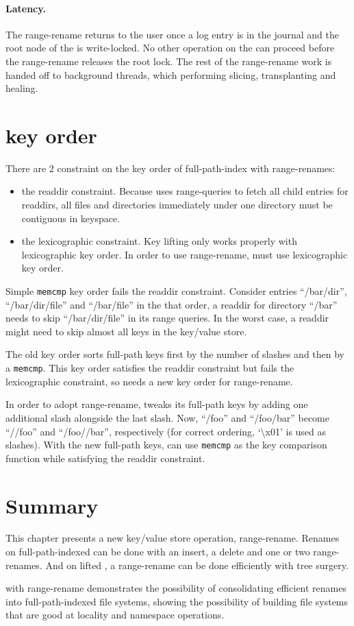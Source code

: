\paragraph{Latency.}
The range-rename returns to the user once a log entry is in the journal and the
root node of the \bet is write-locked.
No other operation on the \bet can proceed before the range-rename releases the
root lock.
The rest of the range-rename work is handed off to background threads, which
performing slicing, transplanting and healing.

\section{\betrfs key order}

There are 2 constraint on the key order of full-path-index \betrfs with
range-renames:

\begin{itemize}
\item the readdir constraint. Because \betrfs uses range-queries to fetch all
child entries for readdirs, all files and directories immediately under one
directory must be contiguous in keyspace.
\item the lexicographic constraint. Key lifting only works properly with
lexicographic key order. In order to use range-rename, \betrfs must use
lexicographic key order.
\end{itemize}

Simple \texttt{memcmp} key order fails the readdir constraint.
Consider entries ``/bar/dir'', ``/bar/dir/file'' and ``/bar/file'' in the that
order, a readdir for directory ``/bar'' needs to skip ``/bar/dir/file'' in
its range queries.
In the worst case, a readdir might need to skip almost all keys in the key/value
store.

The old \betrfs key order sorts full-path keys first by the number of slashes
and then by a \texttt{memcmp}.
This key order satisfies the readdir constraint but fails the lexicographic
constraint, so \betrfs needs a new key order for range-rename.

In order to adopt range-rename, \betrfs tweaks its full-path keys by adding one
additional slash alongside the last slash.
Now, ``/foo'' and ``/foo/bar'' become ``//foo'' and ``/foo//bar'', respectively
(for correct ordering, `\textbackslash x01' is used as slashes).
With the new full-path keys, \betrfs can use \texttt{memcmp} as the key
comparison function while satisfying the readdir constraint.

\section{Summary}

This chapter presents a new key/value store operation, range-rename.
Renames on full-path-indexed \betrfs can be done with an insert, a delete and
one or two range-renames.
And on lifted \bets, a range-rename can be done efficiently with tree surgery.

\betrfs with range-rename demonstrates the possibility of consolidating
efficient renames into full-path-indexed file systems, showing the possibility
of building file systems that are good at locality and namespace operations.

